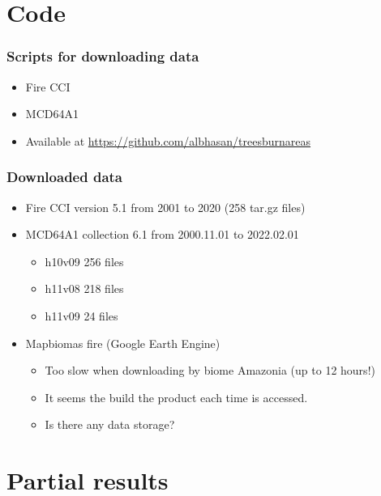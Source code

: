 \documentclass{beamer}
\begin{document}
\section{Code}

\begin{frame}
    \frametitle{Scripts for downloading data}
    \begin{itemize}
        \item Fire CCI
        \item MCD64A1
        \item Available at \url{https://github.com/albhasan/treesburnareas}
    \end{itemize}
\end{frame}

\begin{frame}
    \frametitle{Downloaded data}
    \begin{itemize}
        \item Fire CCI version 5.1 from 2001 to 2020 (258 tar.gz files)
        \item MCD64A1 collection 6.1 from 2000.11.01 to 2022.02.01 
            \begin{itemize}
                \item h10v09 256 files
                \item h11v08 218 files 
                \item h11v09  24 files
            \end{itemize}
        \item Mapbiomas fire (Google Earth Engine)
            \begin{itemize}
                \item Too slow when downloading by biome Amazonia (up to 12 
                    hours!)
                \item It seems the build the product each time is accessed.
                \item Is there any data storage? 
            \end{itemize}
    \end{itemize}
\end{frame}


\section{Partial results}
\end{document}
